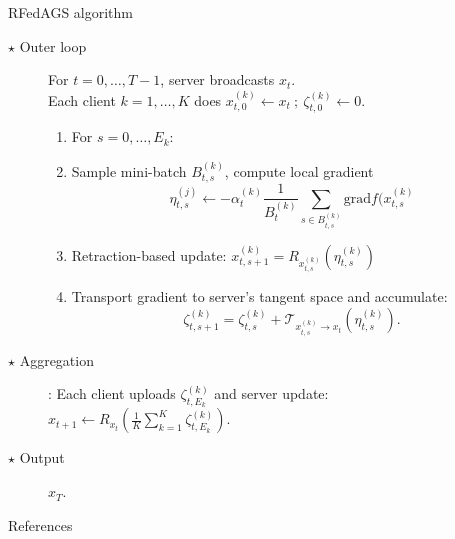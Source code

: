 \documentclass[aspectratio=169,xcolor=dvipsnames]{beamer}
\begin{document}
\begin{frame}{RFedAGS algorithm}
\begin{description}
\item[$\star$ Outer loop] For $t=0,\dots, T-1$, server broadcasts $x_t$. \\Each client $k=1,\dots, K$ does $x_{t,0}^{(k)} \leftarrow x_t~;~\zeta_{t,0}^{(k)}\leftarrow 0$.
\begin{enumerate}
\item For $s=0,\dots, E_k$: 
\item Sample mini-batch $B_{t,s}^{(k)}$, compute local gradient
$$\eta_{t,s}^{(j)}\leftarrow -\alpha_t^{(k)}\frac{1}{B_t^{(k)}}\sum_{s\in B_{t,s}^{(k)}}\text{grad}f(x_{t,s}^{(k)}$$
\item Retraction-based update: $x_{t,s+1}^{(k)}=R_{x_{t,s}^{(k)}}(\eta_{t,s}^{(k)})$
\item Transport gradient to server's tangent space and accumulate:
$$\zeta_{t,s+1}^{(k)}=\zeta_{t,s}^{(k)}+\mathcal{T}_{ x_{t,s}^{(k)}\to x_t}(\eta_{t,s}^{(k)}).$$
\end{enumerate}
\item[$\star$ Aggregation]:
 Each client uploads $\zeta_{t,E_k}^{(k)}$ and server update: $x_{t+1}\leftarrow R_{x_t}\left(\frac{1}{K}\sum_{k=1}^{K}\zeta_{t,E_k}^{(k)}\right).$
\item[$\star$ Output] $x_T$.
\end{description}

\end{frame}

\begin{frame}{References}
\tiny


\end{frame}
\end{document}
